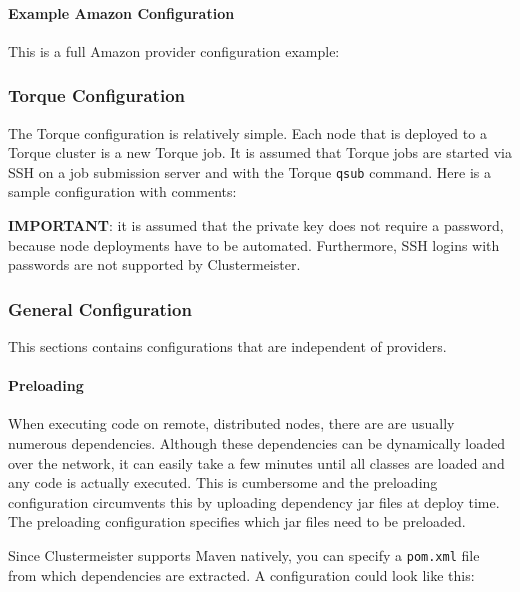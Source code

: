 \paragraph{Example Amazon Configuration}

This is a full Amazon provider configuration example:



\subsubsection{Torque Configuration}

The Torque configuration is relatively simple. Each node that is deployed to a Torque cluster is a new Torque job. It is assumed that Torque jobs are started via SSH on a job submission server and with the Torque \texttt{qsub} command. Here is a sample configuration with comments:



\textbf{IMPORTANT}: it is assumed that the private key does not require a password, because node deployments have to be automated. Furthermore, SSH logins with passwords are not supported by Clustermeister.

\subsubsection{General Configuration}

This sections contains configurations that are independent of providers.

\paragraph{Preloading}

When executing code on remote, distributed nodes, there are are usually numerous dependencies. Although these dependencies can be dynamically loaded over the network, it can easily take a few minutes until all classes are loaded and any code is actually executed. This is cumbersome and the preloading configuration circumvents this by uploading dependency jar files at deploy time. The preloading configuration specifies which jar files need to be preloaded.

Since Clustermeister supports Maven natively, you can specify a \texttt{pom.xml} file from which dependencies are extracted. A configuration could look like this:


